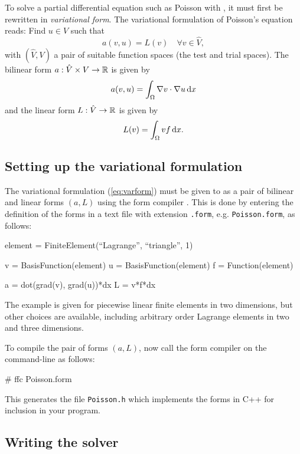 To solve a partial differential equation such as Poisson
with \dolfin{}, it must first be rewritten in \emph{variational form}.
The variational formulation of Poisson's equation reads:
Find $u \in V$ such that
\begin{equation} \label{eq:varform}
  a(v, u) = L(v) \quad \forall v\in \hat{V}, 
\end{equation}
with $(\hat{V}, V)$ a pair of suitable function spaces (the test and
trial spaces). The bilinear form $a : \hat{V} \times V \rightarrow
\mathbb{R}$ is given by
\begin{equation}
  a(v, u) = \int_{\Omega} \nabla v \cdot \nabla u \, \mathrm{d}x
\end{equation}
and the linear form $L : \hat{V} \rightarrow \mathbb{R}$ is given by
\begin{equation}
  L(v) = \int_{\Omega} v f \, \mathrm{d}x.
\end{equation}

\subsection{Setting up the variational formulation}

The variational formulation (\ref{eq:varform}) must be given to
\dolfin{} as a pair of bilinear and linear forms $(a, L)$ using the
form compiler \ffc{}. This is done by entering the definition of
the forms in a text file with extension \texttt{.form},
e.g. \texttt{Poisson.form}, as follows:
\begin{code}
  element = FiniteElement(``Lagrange'', ``triangle'', 1)

  v = BasisFunction(element)
  u = BasisFunction(element)
  f = Function(element)
  
  a = dot(grad(v), grad(u))*dx
  L = v*f*dx
\end{code}

The example is given for piecewise linear finite elements in two
dimensions, but other choices are available, including arbitrary order
Lagrange elements in two and three dimensions.

To compile the pair of forms $(a, L)$, now call the form compiler on
the command-line as follows:
\begin{code}
  # ffc Poisson.form
\end{code}
This generates the file \texttt{Poisson.h} which implements the forms
in C++ for inclusion in your \dolfin{} program.

\subsection{Writing the solver}

